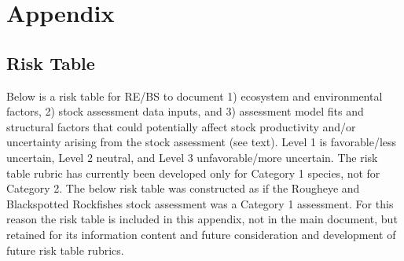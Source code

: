 \documentclass[
  english,
]{article}
\begin{document}
\newpage{}

\newpage{}

\section{Appendix}\label{sec-appendix}

\subsection{Risk Table}\label{risk-table-1}

Below is a risk table for RE/BS to document 1) ecosystem and
environmental factors, 2) stock assessment data inputs, and 3)
assessment model fits and structural factors that could potentially
affect stock productivity and/or uncertainty arising from the stock
assessment (see text). Level 1 is favorable/less uncertain, Level 2
neutral, and Level 3 unfavorable/more uncertain. The risk table rubric
has currently been developed only for Category 1 species, not for
Category 2. The below risk table was constructed as if the Rougheye and
Blackspotted Rockfishes stock assessment was a Category 1 assessment.
For this reason the risk table is included in this appendix, not in the
main document, but retained for its information content and future
consideration and development of future risk table rubrics.
\end{document}
